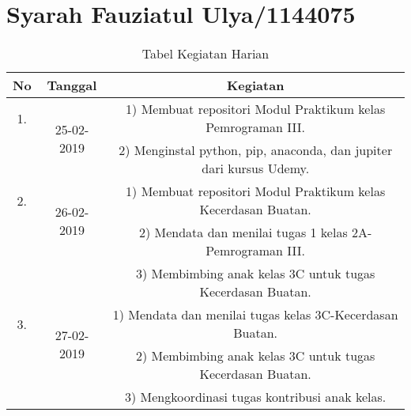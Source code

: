 \chapter{Syarah Fauziatul Ulya/1144075}
\begin{table}[h]
\caption{Tabel Kegiatan Harian}
\centering
\begin{tabular}{|c|c|c|}
\hline
No&Tanggal&Kegiatan\\
\hline
1.&\multirow{2}{*}{25-02-2019}&1) Membuat repositori Modul Praktikum kelas Pemrograman III.\\
&&2) Menginstal python, pip, anaconda, dan jupiter dari kursus Udemy.\\
\hline
2.&\multirow{2}{*}{26-02-2019}&1) Membuat repositori Modul Praktikum kelas Kecerdasan Buatan.\\
&&2) Mendata dan menilai tugas 1 kelas 2A- Pemrograman III.\\
&&3) Membimbing anak kelas 3C untuk tugas Kecerdasan Buatan.\\
\hline
3.&\multirow{2}{*}{27-02-2019}&1) Mendata dan menilai tugas kelas 3C-Kecerdasan Buatan.\\
&&2) Membimbing anak kelas 3C untuk tugas Kecerdasan Buatan.\\
&&3) Mengkoordinasi tugas kontribusi anak kelas.\\
\hline
\end{tabular}
\label{table:contoh}
\end{table}

